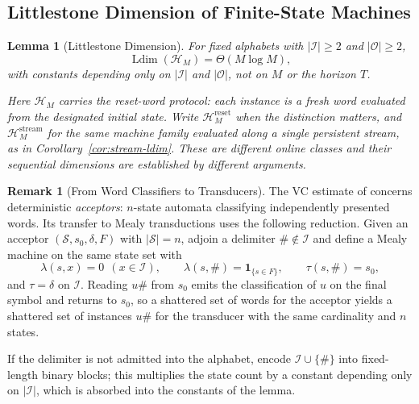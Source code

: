 \documentclass[12pt]{article}
\newtheorem{lemma}[theorem]{Lemma}
\theoremstyle{definition}
\newtheorem{remark}[theorem]{Remark}
\DeclareMathOperator{\Ldim}{Ldim}
\begin{document}
\subsection{Littlestone Dimension of Finite-State Machines}
\label{subsec:littlestone}

\begin{lemma}[Littlestone Dimension]
\label{lem:littlestone}
For fixed alphabets with $|\mathcal I|\ge2$ and $|\mathcal O|\ge2$,
\[
\Ldim(\mathcal H_M)
=
\Theta(M\log M),
\]
with constants depending only on $|\mathcal I|$ and $|\mathcal O|$, not on $M$
or the horizon $T$.

Here $\mathcal H_M$ carries the \emph{reset-word} protocol: each instance is a
fresh word evaluated from the designated initial state.  Write
$\mathcal H_M^{\mathrm{reset}}$ when the distinction matters, and
$\mathcal H_M^{\mathrm{stream}}$ for the same machine family evaluated along a
single persistent stream, as in Corollary~\ref{cor:stream-ldim}.  These are
different online classes and their sequential dimensions are established by
different arguments.
\end{lemma}

\begin{remark}[From Word Classifiers to Transducers]
\label{rem:dfa-to-mealy}
The VC estimate of \cite{ishigami1993} concerns deterministic \emph{acceptors}:
$n$-state automata classifying independently presented words.  Its transfer to
Mealy transductions uses the following reduction.  Given an acceptor
$(\mathcal S,s_0,\delta,F)$ with $|\mathcal S|=n$, adjoin a delimiter
$\#\notin\mathcal I$ and define a Mealy machine on the same state set with
\[
\lambda(s,x)=0\ \ (x\in\mathcal I),
\qquad
\lambda(s,\#)=\mathbf 1_{\{s\in F\}},
\qquad
\tau(s,\#)=s_0,
\]
and $\tau=\delta$ on $\mathcal I$.  Reading $u\#$ from $s_0$ emits the
classification of $u$ on the final symbol and returns to $s_0$, so a shattered
set of words for the acceptor yields a shattered set of instances $u\#$ for the
transducer with the same cardinality and $n$ states.

If the delimiter is not admitted into the alphabet, encode $\mathcal I\cup\{\#\}$
into fixed-length binary blocks; this multiplies the state count by a constant
depending only on $|\mathcal I|$, which is absorbed into the constants of the
lemma.
\end{remark}
\end{document}
